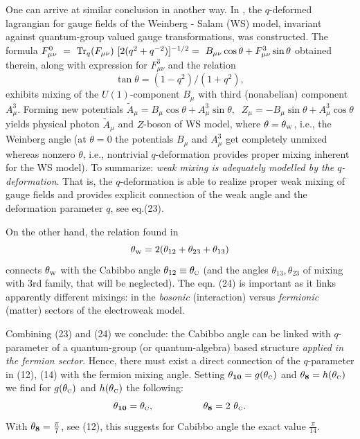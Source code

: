 \documentclass[twoside]{article}
\newcommand{\scr}{\rm\scriptscriptstyle}
\begin{document}
One can arrive at similar conclusion in another way. In    \cite{isa-po},
the $q$-deformed lagrangian for gauge fields of the Weinberg - Salam (WS)
model, invariant against quantum-group valued gauge transformations,
was constructed. The formula
$F^0_{\mu\nu}\ =\ {\rm Tr}_q(F_{\mu\nu})\ [2(q^2 + q^{-2})]^{-1/2}
 = \ B_{\mu\nu} \cos\theta + F^3_{\mu\nu}\sin\theta $  obtained therein,
along with expression for $F^3_{\mu\nu}$ and the relation
\begin{equation}
    \tan\theta = (1-q^2)/(1+q^2) ,                          \label{23}
\end{equation}
exhibits mixing of the $U(1)$-component $B_\mu$ with third (nonabelian)
component $A^3_\mu$.  Forming new potentials
$\tilde{A}_\mu = B_\mu\cos\theta + A^3_\mu \sin\theta,$
$\ Z_\mu=-B_\mu \sin\theta + A^3_\mu \cos\theta$  yields
physical photon $\tilde{A}_\mu$ and $Z$-boson of WS model,
where $\theta=\theta_{\rm\scr{W}}$, i.e., the Weinberg angle
(at $\theta = 0$ the potentials $B_\mu$ and $A^3_\mu$ get
completely unmixed whereas nonzero $\theta$, i.e., nontrivial
$q$-deformation provides proper mixing inherent for the WS model).
To summarize: {\em weak mixing is adequately modelled by
the $q$-deformation}. That is, the $q$-deformation is able to
realize proper weak mixing of gauge fields and provides explicit
connection of the weak angle and the deformation parameter $q$,
see eq.(23).

On the other hand, the relation found in   \cite{palle}
\begin{equation}
\theta_{\scr{W}}
         = 2 (\theta_{12} + \theta_{23} + \theta_{13})      \label{24}
\end{equation}
connects $\theta_{\scr{W}}$ with the Cabibbo angle
$\theta_{12}\equiv \theta_{\scr{C}}$ (and the angles
$\theta_{13}, \theta_{23}$ of mixing with 3rd family,
that will be neglected).
The eqn. (24) is important as it links apparently different
mixings: in the {\it bosonic} (interaction) versus
{\it fermionic} (matter) sectors of the electroweak model.

Combining (23) and (24)
we conclude: the Cabibbo angle can be linked with
$q$-parameter of a quantum-group (or quantum-algebra)
based structure {\it applied in the fermion sector}.
%
Hence, there must exist a direct connection of the $q$-parameter
in (12), (14) with the fermion mixing angle. Setting
$\theta_{\bf 10}=g(\theta_{\scr{C}})$ and
$\theta_{\bf 8}=h(\theta_{\scr{C}})$ we find for $g(\theta_{\scr{C}})$
and $h(\theta_{\scr{C}})$ the following:
\begin{equation}
\theta_{\bf 10}=\theta_{\scr{C}},
\hspace{18mm}  \theta_{\bf 8}=2~\theta_{\scr{C}}.         \label{(25)}
\end{equation}
With $\theta_{\bf 8}=\frac{\pi}{7}$, see (12),
this suggests for Cabibbo angle the exact value
$\frac{\pi}{14}$.
\end{document}
